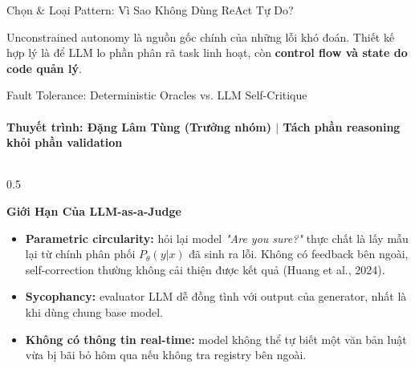 \documentclass[aspectratio=1610,10pt,xcolor={table}]{beamer}
\begin{document}
\begin{frame}{Chọn \& Loại Pattern: Vì Sao Không Dùng ReAct Tự Do?}
  \vspace{0.05cm}
  \begin{tcolorbox}[colback=boxbg,colframe=hcmutblue,title={\textbf{Bài Học Rút Ra}},fonttitle=\footnotesize\bfseries]
    \scriptsize Unconstrained autonomy là nguồn gốc chính của những lỗi khó đoán. Thiết kế hợp lý là để LLM lo phần phân rã task linh hoạt, còn \textbf{control flow và state do code quản lý}.
  \end{tcolorbox}
\end{frame}

\begin{frame}{Fault Tolerance: Deterministic Oracles vs. LLM Self-Critique}
  \framesubtitle{Thuyết trình: Đặng Lâm Tùng (Trưởng nhóm) $\vert$ Tách phần reasoning khỏi phần validation}

  \begin{columns}[t]
    \begin{column}{0.5\textwidth}
      \begin{alertblock}{\textbf{Giới Hạn Của LLM-as-a-Judge}}
        \scriptsize
        \begin{itemize}
          \item \textbf{Parametric circularity:} hỏi lại model \textit{"Are you sure?"} thực chất là lấy mẫu lại từ chính phân phối $P_\theta(y \vert x)$ đã sinh ra lỗi. Không có feedback bên ngoài, self-correction thường không cải thiện được kết quả (Huang et al., 2024).
          \item \textbf{Sycophancy:} evaluator LLM dễ đồng tình với output của generator, nhất là khi dùng chung base model.
          \item \textbf{Không có thông tin real-time:} model không thể tự biết một văn bản luật vừa bị bãi bỏ hôm qua nếu không tra registry bên ngoài.
        \end{itemize}
      \end{alertblock}
    \end{column}


\end{columns}
\end{frame}
\end{document}
